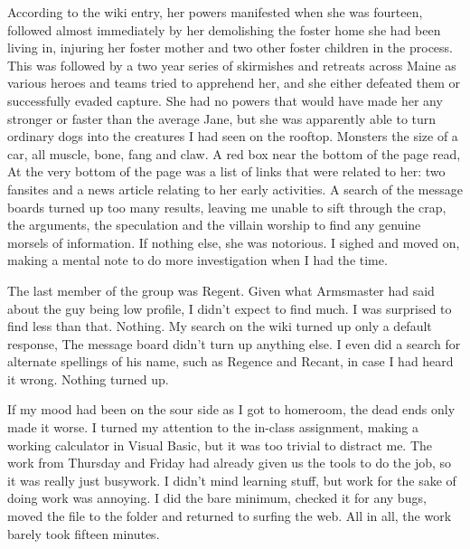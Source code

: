 According to the wiki entry, her powers manifested when she was fourteen, followed almost immediately by her demolishing the foster home she had been living in, injuring her foster mother and two other foster children in the process. This was followed by a two year series of skirmishes and retreats across Maine as various heroes and teams tried to apprehend her, and she either defeated them or successfully evaded capture. She had no powers that would have made her any stronger or faster than the average Jane, but she was apparently able to turn ordinary dogs into the creatures I had seen on the rooftop. Monsters the size of a car, all muscle, bone, fang and claw. A red box near the bottom of the page read,  At the very bottom of the page was a list of links that were related to her: two fansites and a news article relating to her early activities. A search of the message boards turned up too many results, leaving me unable to sift through the crap, the arguments, the speculation and the villain worship to find any genuine morsels of information. If nothing else, she was notorious. I sighed and moved on, making a mental note to do more investigation when I had the time.

The last member of the group was Regent. Given what Armsmaster had said about the guy being low profile, I didn't expect to find much. I was surprised to find less than that. Nothing. My search on the wiki turned up only a default response,  The message board didn't turn up anything else. I even did a search for alternate spellings of his name, such as Regence and Recant, in case I had heard it wrong. Nothing turned up.

If my mood had been on the sour side as I got to homeroom, the dead ends only made it worse. I turned my attention to the in-class assignment, making a working calculator in Visual Basic, but it was too trivial to distract me. The work from Thursday and Friday had already given us the tools to do the job, so it was really just busywork. I didn't mind learning stuff, but work for the sake of doing work was annoying. I did the bare minimum, checked it for any bugs, moved the file to the  folder and returned to surfing the web. All in all, the work barely took fifteen minutes.

